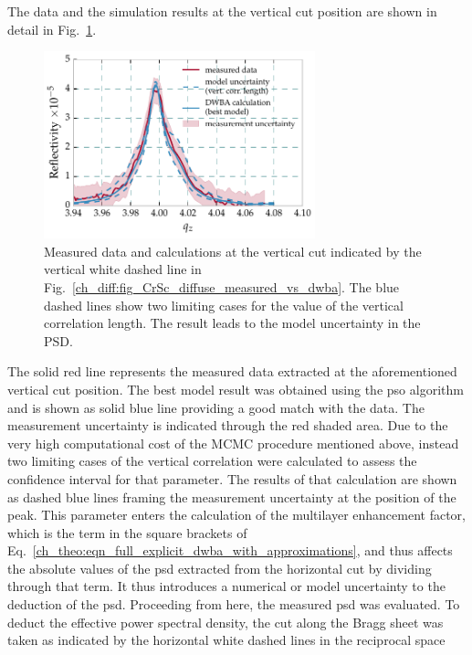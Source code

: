 The data and the simulation results at the vertical cut position are shown in detail in Fig.~\ref{ch_diff:fig_CrSc_diffuse_vertical_correlation}.
\begin{figure}[htbp]
  \centering
  \includegraphics[width=0.7\textwidth]{img/CrSc_diffuse_vertical_correlation}
  \caption[Measured data and calculations at the vertical cut.]{Measured data and calculations at the vertical cut indicated by the vertical white dashed line in Fig.~\ref{ch_diff:fig_CrSc_diffuse_measured_vs_dwba}. The blue dashed lines show two limiting cases for the value of the vertical correlation length. The result leads to the model uncertainty in the PSD.}
  \label{ch_diff:fig_CrSc_diffuse_vertical_correlation}
\end{figure}
The solid red line represents the measured data extracted at the aforementioned vertical cut position. The best model result was obtained using the \gls{pso} algorithm and is shown as solid blue line providing a good match with the data. The measurement uncertainty is indicated through the red shaded area. Due to the very high computational cost of the MCMC procedure mentioned above, instead two limiting cases of the vertical correlation were calculated to assess the confidence interval for that parameter. The results of that calculation are shown as dashed blue lines framing the measurement uncertainty at the position of the peak. This parameter enters the calculation of the multilayer enhancement factor, which is the term in the square brackets of Eq.~\eqref{ch_theo:eqn_full_explicit_dwba_with_approximations}, and thus affects the absolute values of the \gls{psd} extracted from the horizontal cut by dividing through that term. It thus introduces a numerical or model uncertainty to the deduction of the \gls{psd}. Proceeding from here, the measured 
\gls{psd} was evaluated. To deduct the effective power spectral density, the cut along the Bragg sheet was taken as indicated by the horizontal white dashed lines in the reciprocal space 
